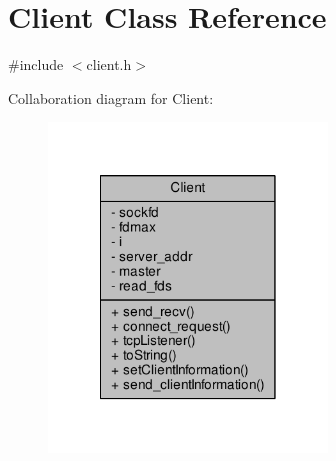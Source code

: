 \hypertarget{class_client}{}\section{Client Class Reference}
\label{class_client}


{\ttfamily \#include $<$client.\+h$>$}



Collaboration diagram for Client\+:
\nopagebreak
\begin{figure}[H]
\begin{center}
\leavevmode
\includegraphics[width=210pt]{class_client__coll__graph}
\end{center}
\end{figure}

